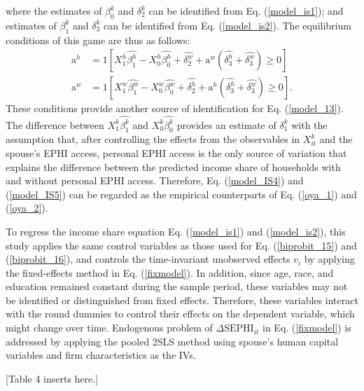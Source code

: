 \documentclass[legno,11pt]{article}
\begin{document}
where the estimates of $\beta^{k}_{0}$ and $\delta^{k}_{2}$ can be identified from Eq. (\ref{model_is1}); and estimates of $\beta^{k}_{1}$ and $\delta^{k}_{3}$ can be identified from Eq. (\ref{model_is2}). The equilibrium conditions of this game are thus as follows:
\begin{align}
\text{a}^{h}&= 1[X^{h}_{1}\widehat{\beta^{h}_{1}}-X^{h}_{0}\widehat{\beta^{h}_{0}}+\widehat{\delta^{w}_{2}}+\text{a}^{w}(\widehat{\delta_{3}^{h}}+\widehat{\delta_{3}^{w}})\geq 0]\label{model_IS4}\\
\text{a}^{w}&=
1[X^{w}_{1}\widehat{\beta^{w}_{1}}-X^{w}_{0}\widehat{\beta^{w}_{0}}+\widehat{\delta^{h}_{2}}+\text{a}^{h}(\widehat{\delta_{3}^{h}}+\widehat{\delta_{3}^{w}})\geq
0]\label{model_IS5}.
\end{align}
These conditions provide another source of identification for Eq. (\ref{model_13}).  The difference between $X^{k}_{1}\widehat{\beta^{k}_{1}}$ and $X^{k}_{0}\widehat{\beta^{k}_{0}}$ provides an estimate of $\delta^{k}_{1}$ with the assumption that, after controlling the effects from the observables in $ X^{k}_{it} $ and the spouse's EPHI access, personal EPHI access is the only source of variation that explains the difference between the predicted income share of households with and without personal EPHI access. Therefore, Eq. (\ref{model_IS4}) and (\ref{model_IS5}) can
be regarded as the empirical counterparts of  Eq. (\ref{oya_1}) and
(\ref{oya_2}).
\par
To regress the income share equation Eq. (\ref{model_is1}) and
(\ref{model_is2}), this study applies the same control variables as those used
for Eq. (\ref{biprobit_15}) and (\ref{biprobit_16}), and controls the
time-invariant unobserved effects $v_{i}$ by applying the
fixed-effects method in Eq. (\ref{fixmodel}). In addition, since
age, race, and education remained constant during the sample period,
these variables may not be identified or distinguished from fixed
effects. Therefore, these variables interact with the round dummies
to control their effects on the dependent variable, which might
change over time. Endogenous problem of $\Delta \text{SEPHI}_{it}$ in Eq. (\ref{fixmodel}) is addressed
by applying the pooled 2SLS method using spouse's human capital
variables and firm characteristics as the IVs.
\par

\begin{center}
[Table 4 inserts here.]
\end{center}
\end{document}
